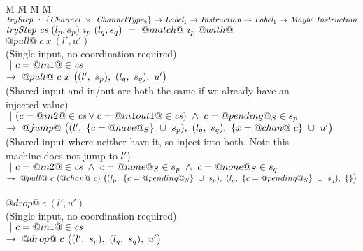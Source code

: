 \newcommand\note[1]{\textcolor{notec}{(#1)}}

\begin{figure}

\begin{tabbing}
M \= M \= M \= M \kill
$\textit{tryStep} ~:~ \{\textit{Channel} ~\times~ \textit{ChannelType}_2\} \to \textit{Label}_1 \to \textit{Instruction} \to \textit{Label}_1 \to \textit{Maybe}~\textit{Instruction}$ \\
$\textit{tryStep} ~\textit{cs}~(l_p,s_p)~i_p~(l_q,s_q)~=~@match@~i_p~@with@$ \\

\> $@pull@~c~x~(l',u')$ \\
\> \> \note{Single input, no coordination required}\\
\> \> $~|~c=@in1@\in\textit{cs}$ \\
\> \> $\to~@pull@~c~x~
      \big((l',~s_p),~(l_q,~s_q),~u' \big)
    $ \\

\> \> \note{Shared input and in/out are both the same if we already have an injected value}\\
\> \> $~|~(c=@in2@\in\textit{cs} \vee c=@in1out1@\in\textit{cs}) ~\wedge~ c=@pending@_S \in s_p$ \\
\> \> $\to~@jump@~
      \big((l',~\{ c=@have@_S \}~\cup~s_p),~(l_q,~s_q),~\{ x=@chan@~c \}~\cup~u' \big)
        $ \\

\> \> \note{Shared input where neither have it, so inject into both. Note this machine does not jump to $l'$}\\
\> \> $~|~c=@in2@\in\textit{cs} ~\wedge~ c=@none@_S \in s_p ~\wedge~ c=@none@_S \in s_q$ \\
\> \> $\to~@pull@~c~(@chan@~c)~
      \big((l_p,~\{ c=@pending@_S \}~\cup~s_p),~(l_q,~\{ c=@pending@_S \}~\cup~s_q),~\{  \} \big)
  $ \\
\\

\> $@drop@~c~(l',u')$ \\
\> \> \note{Single input, no coordination required} \\
\> \> $~|~c=@in1@\in\textit{cs}$ \\
\> \> $\to~@drop@~c~
      \big((l',~s_p),~(l_q,~s_q),~u' \big)
      $ \\


\end{tabbing}
\end{figure}

